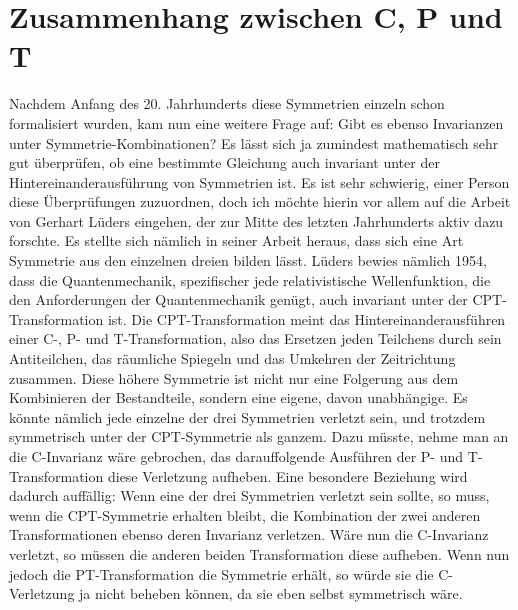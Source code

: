 \documentclass[12pt,a4paper]{scrartcl}
\numberwithin{equation}{section}
\begin{document}
  \newpage  %

  \section{Zusammenhang zwischen C, P und T}

Nachdem Anfang des 20. Jahrhunderts diese Symmetrien einzeln schon formalisiert wurden, kam nun eine weitere Frage auf: Gibt es ebenso Invarianzen unter Symmetrie-Kombinationen? Es lässt sich ja zumindest mathematisch sehr gut überprüfen, ob eine bestimmte Gleichung auch invariant unter der Hintereinanderausführung von Symmetrien ist. Es ist sehr schwierig, einer Person diese Überprüfungen zuzuordnen, doch ich möchte hierin vor allem auf die Arbeit von Gerhart Lüders eingehen, der zur Mitte des letzten Jahrhunderts aktiv dazu forschte. Es stellte sich nämlich in seiner Arbeit heraus, dass sich eine Art \grqq{} Symmetrie aus den einzelnen dreien bilden lässt. Lüders bewies nämlich 1954, dass die Quantenmechanik, spezifischer jede relativistische Wellenfunktion, die den Anforderungen der Quantenmechanik genügt, auch invariant unter der CPT-Transformation ist. Die CPT-Transformation meint das Hintereinanderausführen einer C-, P- und T-Transformation, also das Ersetzen jeden Teilchens durch sein Antiteilchen, das räumliche Spiegeln und das Umkehren der Zeitrichtung zusammen. Diese höhere Symmetrie ist nicht nur eine Folgerung aus dem Kombinieren der Bestandteile, sondern eine eigene, davon unabhängige. Es könnte nämlich jede einzelne der drei Symmetrien verletzt sein, und trotzdem symmetrisch unter der CPT-Symmetrie als ganzem. Dazu müsste, nehme man an die C-Invarianz wäre gebrochen, \grqq{} das darauffolgende Ausführen der P- und T-Transformation diese Verletzung aufheben. Eine besondere Beziehung wird dadurch auffällig: Wenn eine der drei Symmetrien verletzt sein sollte, so muss, wenn die CPT-Symmetrie erhalten bleibt, die Kombination der zwei anderen Transformationen ebenso deren Invarianz verletzen. Wäre nun die C-Invarianz verletzt, so müssen die anderen beiden Transformation diese aufheben. Wenn nun jedoch die PT-Transformation die Symmetrie erhält, so würde sie die C-Verletzung ja nicht beheben können, da sie eben selbst symmetrisch wäre. \cite{lueders54} \\
\end{document}

